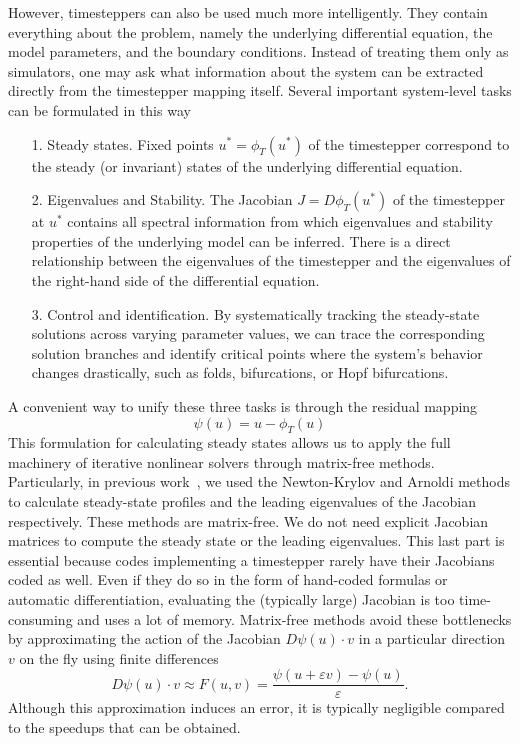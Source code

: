 \documentclass{article}
\begin{document}
However, timesteppers can also be used much more intelligently. They contain everything about the problem, namely the underlying differential equation, the model parameters, and the boundary conditions. Instead of treating them only as simulators, one may ask what information about the system can be extracted directly from the timestepper mapping itself. Several important system-level tasks can be formulated in this way
\begin{itemize}
\item[1.] Steady states. Fixed points $u^* = \phi_{T}\left(u^*\right)$ of the timestepper correspond to the steady (or invariant) states of the underlying differential equation.
\item[2.] Eigenvalues and Stability. The Jacobian $J = D\phi_{T}(u^*)$ of the timestepper at $u^*$ contains all spectral information from which eigenvalues and stability properties of the underlying model can be inferred. There is a direct relationship between the eigenvalues of the timestepper and the eigenvalues of the right-hand side of the differential equation.
\item[3.] Control and identification. By systematically tracking the steady-state solutions across varying parameter values, we can trace the corresponding solution branches and identify critical points where the system’s behavior changes drastically, such as folds, bifurcations, or Hopf bifurcations.
\end{itemize}
A convenient way to unify these three tasks is through the residual mapping
\begin{equation} \label{eq:psi}
    \psi(u) = u - \phi_{T}\left(u\right)
\end{equation}
This formulation for calculating steady states allows us to apply the full machinery of iterative nonlinear solvers through matrix-free methods. Particularly, in previous work~\cite{}, we used the Newton-Krylov and Arnoldi methods to calculate steady-state profiles and the leading eigenvalues of the Jacobian respectively. These methods are matrix-free. We do not need explicit Jacobian matrices to compute the steady state or the leading eigenvalues. This last part is essential because codes implementing a timestepper rarely have their Jacobians coded as well. Even if they do so in the form of hand-coded formulas or automatic differentiation, evaluating the (typically large) Jacobian is too time-consuming and uses a lot of memory. Matrix-free methods avoid these bottlenecks by approximating the action of the Jacobian $D \psi(u) \cdot v$ in a particular direction $v$ on the fly using finite differences
\begin{equation} \label{eq:JVP}
    D \psi(u) \cdot v \approx F(u, v) = \frac{\psi(u + \varepsilon v) - \psi(u)}{\varepsilon}.
\end{equation}
Although this approximation induces an error, it is typically negligible compared to the speedups that can be obtained.
\end{document}
